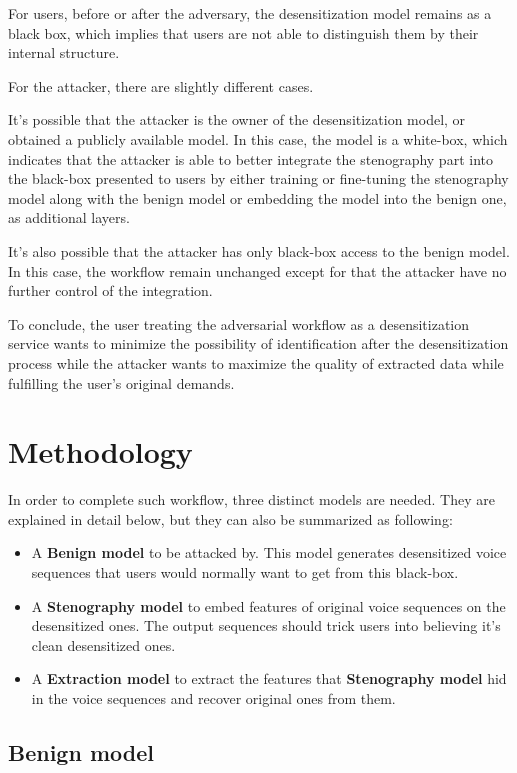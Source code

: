 \documentclass[journal]{IEEEtran} %
\begin{document}
\begin{CJK*}{UTF8}{gbsn}
For users, before or after the adversary, the desensitization model remains as a black box, which implies that users are not able to distinguish them by their internal structure.

For the attacker, there are slightly different cases.

It's possible that the attacker is the owner of the desensitization model, or obtained a publicly available model. In this case, the model is a white-box, which indicates that the attacker is able to better integrate the stenography part into the black-box presented to users by either training or fine-tuning the stenography model along with the benign model or embedding the model into the benign one, as additional layers.

It's also possible that the attacker has only black-box access to the benign model. In this case, the workflow remain unchanged except for that the attacker have no further control of the integration.

To conclude, the user treating the adversarial workflow as a desensitization service wants to minimize the possibility of identification after the desensitization process while the attacker wants to maximize the quality of extracted data while fulfilling the user's original demands.

\section{Methodology}

In order to complete such workflow, three distinct models are needed. They are explained in detail below, but they can also be summarized as following:
\begin{itemize}
    \item A \textbf{Benign model} to be attacked by. This model generates desensitized voice sequences that users would normally want to get from this black-box.
    \item A \textbf{Stenography model} to embed features of original voice sequences on the desensitized ones. The output sequences should trick users into believing it's clean desensitized ones.
    \item A \textbf{Extraction model} to extract the features that \textbf{Stenography model} hid in the voice sequences and recover original ones from them.
\end{itemize}

\subsection{Benign model}


\end{CJK*}
\end{document}
